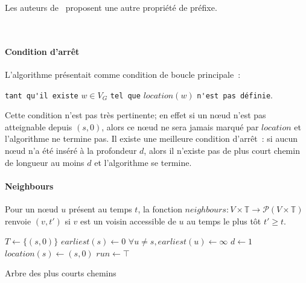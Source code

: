 \documentclass[12pt,a4paper]{article}
\begin{document}
Les auteurs de~\cite{DBLP:journals/ijfcs/XuanFJ03} proposent une autre
propriété de préfixe.

\noindent
{}\\

\paragraph{Condition d'arrêt}
L'algorithme présentait comme condition de boucle principale~:
\begin{center}
  \verb|tant qu'il existe| \(w \in V_G\) \verb|tel que|
  \(location(w)\) \verb|n'est pas définie|.
\end{center}
Cette condition n'est pas très pertinente; en effet si un nœud n'est
pas atteignable depuis \((s, 0)\), alors ce nœud ne sera jamais marqué
par \(location\) et l'algorithme ne termine pas. Il existe une
meilleure condition d'arrêt~: si aucun nœud n'a été inséré à la
profondeur \(d\), alors il n'existe pas de plus court chemin de
longueur au moins \(d\) et l'algorithme se termine.

\paragraph{Neighbours}
Pour un nœud \(u\) présent au temps \(t\), la fonction
\(neighbours : V \times \mathbb{T} \to \mathcal{P}(V \times
\mathbb{T})\) renvoie \((v, t')\) si \(v\) est un voisin accessible de
\(u\) au temps le plus tôt \(t' \geq t\).\\

\begin{algorithm}[H]
  \DontPrintSemicolon{}
  \(T \leftarrow \{(s, 0)\}\)\;
  \(earliest(s) \leftarrow 0\)\;
  \(\forall u \neq s, earliest(u) \leftarrow \infty\)\;
  \(d \leftarrow 1\)\;
  \(location(s) \leftarrow (s, 0)\)\;
  \(run \leftarrow \top\)\;
  \caption{Arbre des plus courts chemins}\label{alg:shortest_path}
\end{algorithm}
\end{document}
